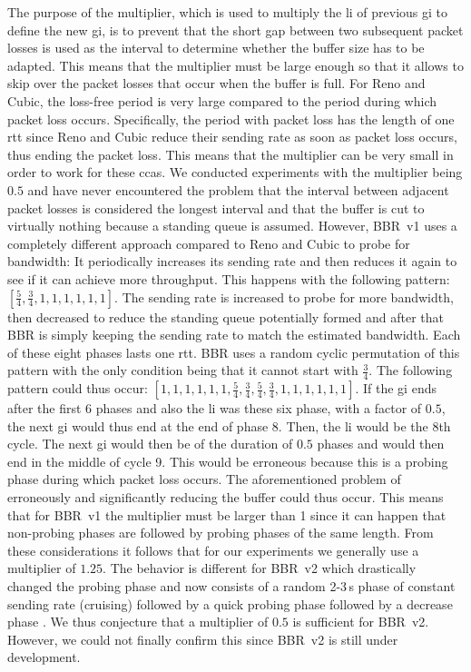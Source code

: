 \documentclass[10pt,sigconf,letterpaper,dvipsnames\ifx\removeHeaders\tempYes ,nonacm\fi]{acmart}
\begin{document}
The purpose of the multiplier, which is used to multiply the \gls{li} of previous \gls{gi} to define the new \gls{gi}, is to prevent that the short gap between two subsequent packet losses is used as the interval to determine whether the buffer size has to be adapted. This means that the multiplier must be large enough so that it allows to skip over the packet losses that occur when the buffer is full. For Reno and Cubic, the loss-free period is very large compared to the period during which packet loss occurs. Specifically, the period with packet loss has the length of one \gls{rtt} since Reno and Cubic reduce their sending rate as soon as packet loss occurs, thus ending the packet loss. This means that the multiplier can be very small in order to work for these \glspl{cca}. We conducted experiments with the multiplier being $0.5$ and have never encountered the problem that the interval between adjacent packet losses is considered the longest interval and that the buffer is cut to virtually nothing because a standing queue is assumed. However, BBR~v1 uses a completely different approach compared to Reno and Cubic to probe for bandwidth: It periodically increases its sending rate and then reduces it again to see if it can achieve more throughput. This happens with the following pattern: $[\frac{5}{4},\frac{3}{4},1,1,1,1,1,1]$. The sending rate is increased to probe for more bandwidth, then decreased to reduce the standing queue potentially formed and after that BBR is simply keeping the sending rate to match the estimated bandwidth. Each of these eight phases lasts one \gls{rtt}. BBR uses a random cyclic permutation of this pattern with the only condition being that it cannot start with $\frac{3}{4}$. The following pattern could thus occur: $[1,1,1,1,1,1,\frac{5}{4},\frac{3}{4},\frac{5}{4},\frac{3}{4},1,1,1,1,1,1]$. If the \gls{gi} ends after the first 6 phases and also the \gls{li} was these six phase, with a factor of $0.5$, the next \gls{gi} would thus end at the end of phase 8. Then, the \gls{li} would be the 8th cycle. The next \gls{gi} would then be of the duration of $0.5$ phases and would then end in the middle of cycle 9. This would be erroneous because this is a probing phase during which packet loss occurs. The aforementioned problem of erroneously and significantly reducing the buffer could thus occur. This means that for BBR~v1 the multiplier must be larger than 1 since it can happen that non-probing phases are followed by probing phases of the same length. From these considerations it follows that for our experiments we generally use a multiplier of $1.25$. The behavior is different for BBR~v2 which drastically changed the probing phase and now consists of a random 2-3\,s phase of constant sending rate (cruising) followed by a quick probing phase followed by a decrease phase \cite{cardwell_bbr_2019}. We thus conjecture that a multiplier of $0.5$ is sufficient for BBR~v2. However, we could not finally confirm this since BBR~v2 is still under development. 
\end{document}
